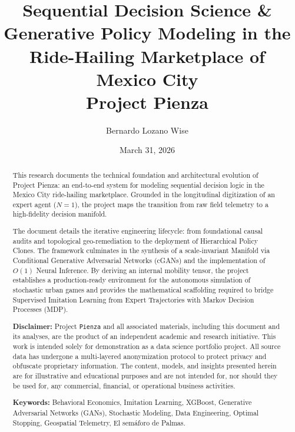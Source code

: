 \documentclass[10pt, letterpaper]{article}
\title{\textbf{Sequential Decision Science \& Generative Policy Modeling in the Ride-Hailing Marketplace of Mexico City}\\ \large Project Pienza}
\author{Bernardo Lozano Wise}
\date{March 31, 2026}
\begin{document}
\maketitle

\begin{abstract}
\noindent This research documents the technical foundation and architectural evolution of Project Pienza: an end-to-end system for modeling sequential decision logic in the Mexico City ride-hailing marketplace. Grounded in the longitudinal digitization of an expert agent ($N=1$), the project maps the transition from raw field telemetry to a high-fidelity decision manifold. 

\vspace{0.4cm}
\noindent The document details the iterative engineering lifecycle: from foundational causal audits and topological geo-remediation to the deployment of Hierarchical Policy Clones. The framework culminates in the synthesis of a scale-invariant Manifold via Conditional Generative Adversarial Networks (cGANs) and the implementation of $O(1)$ Neural Inference. By deriving an internal mobility tensor, the project establishes a production-ready environment for the autonomous simulation of stochastic urban games and provides the mathematical scaffolding required to bridge Supervised Imitation Learning from Expert Trajectories with Markov Decision Processes (MDP).

\vspace{0.4cm}
\noindent \textbf{Disclaimer:} Project \texttt{Pienza} and all associated materials, including this document and its analyses, are the product of an independent academic and research initiative. This work is intended solely for demonstration as a data science portfolio project. All source data has undergone a multi-layered anonymization protocol to protect privacy and obfuscate proprietary information. The content, models, and insights presented herein are for illustrative and educational purposes and are not intended for, nor should they be used for, any commercial, financial, or operational business activities.

\vspace{0.4cm}
\noindent \textbf{Keywords:} Behavioral Economics, Imitation Learning, XGBoost, Generative Adversarial Networks (GANs), Stochastic Modeling, Data Engineering, Optimal Stopping, Geospatial Telemetry, El semáforo de Palmas.
\end{abstract}

\tableofcontents
\newpage
\end{document}
